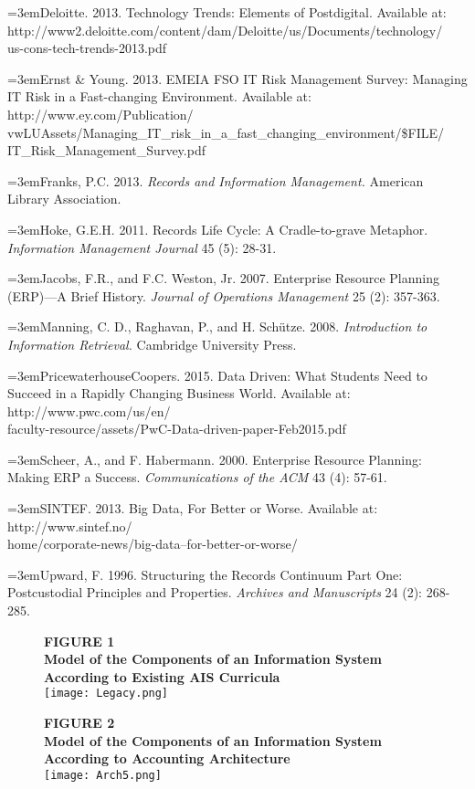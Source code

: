 \documentclass[12pt]{article}
\newcommand{\Reference}[1]{\parindent=0pt\hangindent=3em\hangafter=1#1\vspace{.15in}}
\begin{document}
\Reference{Deloitte. 2013. Technology Trends: Elements of Postdigital. Available at:\\http://www2.deloitte.com/content/dam/Deloitte/us/Documents/technology/\\us-cons-tech-trends-2013.pdf}

\Reference{Ernst \& Young. 2013. EMEIA FSO IT Risk Management Survey: Managing IT Risk in a Fast-changing Environment. Available at: http://www.ey.com/Publication/\\vwLUAssets/Managing\_IT\_risk\_in\_a\_fast\_changing\_environment/\$FILE/\\IT\_Risk\_Management\_Survey.pdf}

\Reference{Franks, P.C. 2013. \emph{Records and Information Management.} American Library Association.}

\Reference{Hoke, G.E.H. 2011. Records Life Cycle: A Cradle-to-grave Metaphor. \emph{Information Management Journal} 45 (5): 28-31.}

\Reference{Jacobs, F.R., and F.C. Weston, Jr. 2007. Enterprise Resource Planning (ERP)---A Brief History. \emph{Journal of Operations Management} 25 (2): 357-363.}

\Reference{Manning, C. D., Raghavan, P., and H. Sch\"utze. 2008. \emph{Introduction to Information Retrieval.} Cambridge University Press.}

\Reference{PricewaterhouseCoopers. 2015. Data Driven: What Students Need to Succeed in a Rapidly Changing Business World. Available at: http://www.pwc.com/us/en/\\faculty-resource/assets/PwC-Data-driven-paper-Feb2015.pdf}

\Reference{Scheer, A., and F. Habermann. 2000. Enterprise Resource Planning: Making ERP a Success. \emph{Communications of the ACM} 43 (4): 57-61.}

\Reference{SINTEF. 2013. Big Data, For Better or Worse. Available at: http://www.sintef.no/\\home/corporate-news/big-data--for-better-or-worse/}

\Reference{Upward, F. 1996. Structuring the Records Continuum Part One: Postcustodial Principles and Properties. \emph{Archives and Manuscripts} 24 (2): 268-285.}

\newpage{}

\begin{figure}[!h]
\begin{center}
\textbf{\MakeUppercase{Figure 1}}\\[.2in]
\textbf{Model of the Components of an Information System According to Existing AIS Curricula}\\[.4in]
\texttt{[image: Legacy.png]}
\end{center}
\end{figure}
\newpage{}

\begin{figure}[!h]
\begin{center}
\textbf{\MakeUppercase{Figure 2}}\\[.2in]
\textbf{Model of the Components of an Information System According to Accounting Architecture}\\[.4in]
\texttt{[image: Arch5.png]}
\end{center}
\end{figure}
\end{document}

